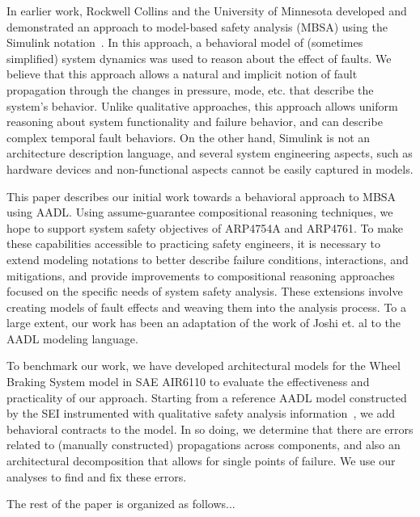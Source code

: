 In earlier work, Rockwell Collins and the University of Minnesota developed and demonstrated an approach to model-based safety analysis (MBSA) using the Simulink notation~.  In this approach, a behavioral model of (sometimes simplified) system dynamics was used to reason about the effect of faults.  We believe that this approach allows a natural and implicit notion of fault propagation through the changes in pressure, mode, etc. that describe the system's behavior.  Unlike qualitative approaches, this approach allows uniform reasoning about system functionality and failure behavior, and can describe complex temporal fault behaviors.  On the other hand, Simulink is not an architecture description language, and several system engineering aspects, such as hardware devices and non-functional aspects cannot be easily captured in models.

\iffalse
Over the last five years, several research groups have focused on formal reasoning at the system architecture level, resulting in MBSE tools that incorporate assume-guarantee compositional reasoning techniques~\cite{Trento and Rockwell and UMN}.  These tools allow behavioral reasoning about complex system models, but with substantially greater scalability than previous approaches.
\fi 

This paper describes our initial work towards a behavioral approach to MBSA using AADL.  Using assume-guarantee compositional reasoning techniques, we hope to support system safety objectives of ARP4754A and ARP4761.  To make these capabilities accessible to practicing safety engineers, it is necessary to extend modeling notations to better describe failure conditions, interactions, and mitigations, and provide improvements to compositional reasoning approaches focused on the specific needs of system safety analysis.  These extensions involve creating models of fault effects and weaving them into the analysis process.  To a large extent, our work has been an adaptation of the work of Joshi et. al to the AADL modeling language.

To benchmark our work, we have developed architectural models for the Wheel Braking System model in SAE AIR6110 to evaluate the effectiveness and practicality of our approach.  Starting from a reference AADL model constructed by the SEI instrumented with qualitative safety analysis information~\cite{}, we add behavioral contracts to the model.  In so doing, we determine that there are errors related to (manually constructed) propagations across components, and also an architectural decomposition that allows for single points of failure.  We use our analyses to find and fix these errors.

The rest of the paper is organized as follows...



